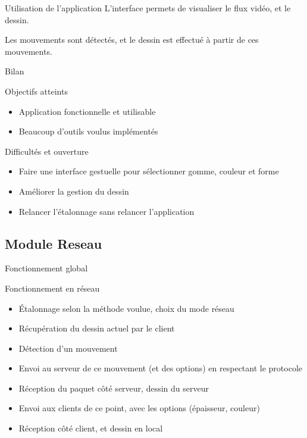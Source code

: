 \documentclass{beamer}
\begin{document}
		\begin{frame}{Utilisation de l'application}
		L'interface permets de visualiser le flux vidéo, et le dessin.
		
		Les mouvements sont détectés, et le dessin est effectué à partir de ces mouvements.
		\end{frame}
		
		\begin{frame}{Bilan}
			\begin{exampleblock}{Objectifs atteints}
				\begin{itemize}
				\item Application fonctionnelle et utilisable
				\item Beaucoup d'outils voulus implémentés
				\end{itemize}
			\end{exampleblock}
			\pause
			\begin{alertblock}{Difficultés et ouverture}
				\begin{itemize}
				\item Faire une interface gestuelle pour sélectionner gomme, couleur et forme
				\item Améliorer la gestion du dessin
				\item Relancer l'étalonnage sans relancer l'application
				\end{itemize}
			\end{alertblock}
		\end{frame}

	\subsection{Module Reseau}
		\begin{frame}{Fonctionnement global}
			\begin{block}{Fonctionnement en réseau}
				\begin{itemize}
				\item Étalonnage selon la méthode voulue, choix du mode réseau
				\item Récupération du dessin actuel par le client
				\item Détection d'un mouvement
				\item Envoi au serveur de ce mouvement (et des options) en respectant le protocole
				\item Réception du paquet côté serveur, dessin du serveur
				\item Envoi aux clients de ce point, avec les options (épaisseur, couleur)
				\item Réception côté client, et dessin en local
				\end{itemize}
			\end{block}
		\end{frame}
		
\end{document}
